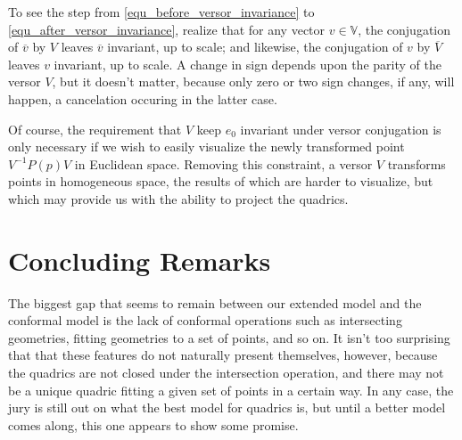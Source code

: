 \documentclass{birkjour}
\theoremstyle{definition}
\theoremstyle{remark}
\numberwithin{equation}{section}
\newcommand{\V}{\mathbb{V}}
\begin{document}
To see the step from \eqref{equ_before_versor_invariance} to \eqref{equ_after_versor_invariance},
realize that for any vector $v\in\V$, the conjugation of $\overline{v}$ by $V$ leaves $\overline{v}$ invariant, up
to scale; and likewise, the conjugation of $v$ by $\overline{V}$ leaves $v$ invariant, up to scale.
A change in sign depends upon the parity of the versor $V$, but it doesn't matter,
because only zero or two sign changes, if any, will happen, a cancelation occuring in the latter case.

Of course, the requirement that $V$ keep $e_0$ invariant under versor conjugation is only necessary
if we wish to easily visualize the newly transformed point $V^{-1}P(p)V$ in Euclidean space.
Removing this constraint, a versor $V$ transforms points in homogeneous space, the results
of which are harder to visualize, but which may provide us with the ability to project the quadrics.

\section{Concluding Remarks}

The biggest gap that seems to remain between our extended model and
the conformal model is the lack of conformal operations such as intersecting geometries, fitting geometries
to a set of points, and so on.  It isn't too surprising that that these features do not
naturally present themselves, however, because the quadrics are not closed under
the intersection operation, and there may not be a unique quadric fitting a given set
of points in a certain way.  In any case, the jury is still out on what the
best model for quadrics is, but until a better model comes along, this one appears
to show some promise.



\end{document}
